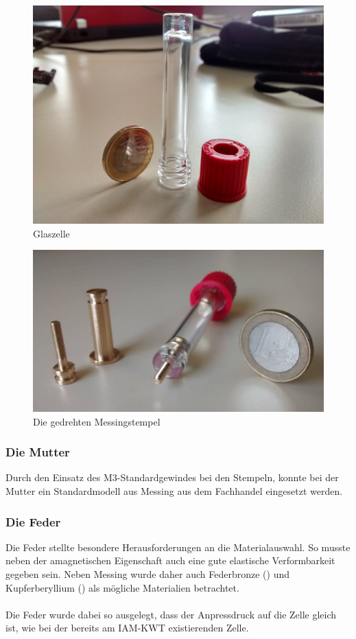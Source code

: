 \documentclass[a4paper, 11pt, headsepline,footsepline,twoside,abstract]{scrbook}
\begin{document}
\begin{figure}
	\centering
	\includegraphics[width=0.6\columnwidth]{images/Glaszelle.jpg}
	\caption{Glaszelle}
	\label{glaszelle_foto}
\end{figure}
\begin{figure}
	\centering
	\includegraphics[width=0.9\columnwidth]{images/Stempel_Foto_cutted.jpg}
	\caption{Die gedrehten Messingstempel}
	\label{stempel_foto}
\end{figure}
\subsubsection{Die Mutter}
Durch den Einsatz des M3-Standardgewindes bei den Stempeln, konnte bei der Mutter ein Standardmodell aus Messing aus dem Fachhandel eingesetzt werden.
\subsubsection{Die Feder}
Die Feder stellte besondere Herausforderungen an die Materialauswahl. So musste neben der amagnetischen Eigenschaft auch eine gute elastische Verformbarkeit gegeben sein. Neben Messing wurde daher auch Federbronze () und Kupferberyllium () als mögliche Materialien betrachtet.
\\\\
Die Feder wurde dabei so ausgelegt, dass der Anpressdruck auf die Zelle gleich ist, wie bei der bereits am IAM-KWT existierenden Zelle.
\end{document}

